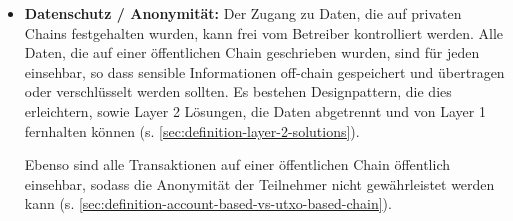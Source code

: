 \begin{itemize}
    \item \textbf{Datenschutz / Anonymität:}
    Der Zugang zu Daten, die auf privaten Chains festgehalten wurden, kann frei vom Betreiber kontrolliert werden. 
    Alle Daten, die auf einer öffentlichen Chain geschrieben wurden, sind für jeden einsehbar, so dass sensible Informationen off-chain gespeichert und übertragen  oder verschlüsselt werden sollten. 
    Es bestehen Designpattern, die dies erleichtern, sowie Layer 2 Lösungen, die Daten abgetrennt und von Layer 1 fernhalten können (s. \ref{sec:definition-layer-2-solutions}).

    Ebenso sind alle Transaktionen auf einer öffentlichen Chain öffentlich einsehbar, sodass die Anonymität der Teilnehmer nicht gewährleistet werden kann (s. \ref{sec:definition-account-based-vs-utxo-based-chain}).
\end{itemize}

% 




